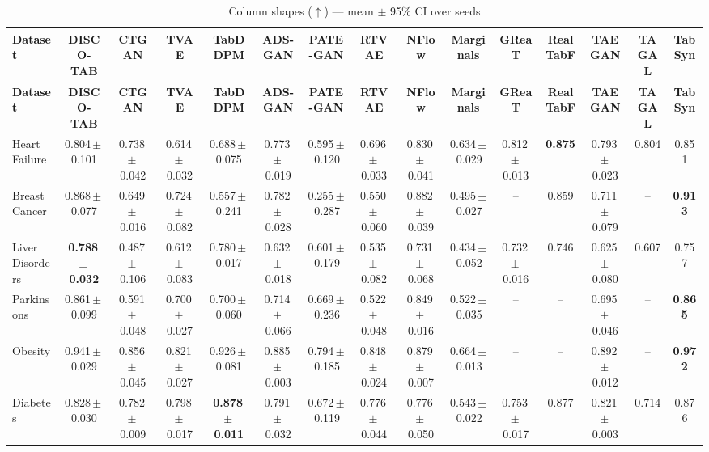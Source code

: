 \documentclass[8pt]{extarticle}
\begin{document}
\begin{longtable}{l*{14}{c}}
\caption{Column shapes ($\uparrow$) --- mean $\pm$ 95\% CI over seeds}\\
\toprule
\textbf{Dataset} & \textbf{DISCO-TAB} & \textbf{CTGAN} & \textbf{TVAE} & \textbf{TabDDPM} & \textbf{ADS-GAN} & \textbf{PATE-GAN} & \textbf{RTVAE} & \textbf{NFlow} & \textbf{Marginals} & \textbf{GReaT} & \textbf{RealTabF} & \textbf{TAEGAN} & \textbf{TAGAL} & \textbf{TabSyn} \\
\midrule
\endfirsthead
\toprule
\textbf{Dataset} & \textbf{DISCO-TAB} & \textbf{CTGAN} & \textbf{TVAE} & \textbf{TabDDPM} & \textbf{ADS-GAN} & \textbf{PATE-GAN} & \textbf{RTVAE} & \textbf{NFlow} & \textbf{Marginals} & \textbf{GReaT} & \textbf{RealTabF} & \textbf{TAEGAN} & \textbf{TAGAL} & \textbf{TabSyn} \\
\midrule
\endhead
\bottomrule
\endfoot
Heart Failure & 0.804\,$\pm$\,0.101 & 0.738\,$\pm$\,0.042 & 0.614\,$\pm$\,0.032 & 0.688\,$\pm$\,0.075 & 0.773\,$\pm$\,0.019 & 0.595\,$\pm$\,0.120 & 0.696\,$\pm$\,0.033 & 0.830\,$\pm$\,0.041 & 0.634\,$\pm$\,0.029 & 0.812\,$\pm$\,0.013 & \textbf{0.875} & 0.793\,$\pm$\,0.023 & 0.804 & 0.851 \\
Breast Cancer & 0.868\,$\pm$\,0.077 & 0.649\,$\pm$\,0.016 & 0.724\,$\pm$\,0.082 & 0.557\,$\pm$\,0.241 & 0.782\,$\pm$\,0.028 & 0.255\,$\pm$\,0.287 & 0.550\,$\pm$\,0.060 & 0.882\,$\pm$\,0.039 & 0.495\,$\pm$\,0.027 & -- & 0.859 & 0.711\,$\pm$\,0.079 & -- & \textbf{0.913} \\
Liver Disorders & \textbf{0.788\,$\pm$\,0.032} & 0.487\,$\pm$\,0.106 & 0.612\,$\pm$\,0.083 & 0.780\,$\pm$\,0.017 & 0.632\,$\pm$\,0.018 & 0.601\,$\pm$\,0.179 & 0.535\,$\pm$\,0.082 & 0.731\,$\pm$\,0.068 & 0.434\,$\pm$\,0.052 & 0.732\,$\pm$\,0.016 & 0.746 & 0.625\,$\pm$\,0.080 & 0.607 & 0.757 \\
Parkinsons & 0.861\,$\pm$\,0.099 & 0.591\,$\pm$\,0.048 & 0.700\,$\pm$\,0.027 & 0.700\,$\pm$\,0.060 & 0.714\,$\pm$\,0.066 & 0.669\,$\pm$\,0.236 & 0.522\,$\pm$\,0.048 & 0.849\,$\pm$\,0.016 & 0.522\,$\pm$\,0.035 & -- & -- & 0.695\,$\pm$\,0.046 & -- & \textbf{0.865} \\
Obesity & 0.941\,$\pm$\,0.029 & 0.856\,$\pm$\,0.045 & 0.821\,$\pm$\,0.027 & 0.926\,$\pm$\,0.081 & 0.885\,$\pm$\,0.003 & 0.794\,$\pm$\,0.185 & 0.848\,$\pm$\,0.024 & 0.879\,$\pm$\,0.007 & 0.664\,$\pm$\,0.013 & -- & -- & 0.892\,$\pm$\,0.012 & -- & \textbf{0.972} \\
Diabetes & 0.828\,$\pm$\,0.030 & 0.782\,$\pm$\,0.009 & 0.798\,$\pm$\,0.017 & \textbf{0.878\,$\pm$\,0.011} & 0.791\,$\pm$\,0.032 & 0.672\,$\pm$\,0.119 & 0.776\,$\pm$\,0.044 & 0.776\,$\pm$\,0.050 & 0.543\,$\pm$\,0.022 & 0.753\,$\pm$\,0.017 & 0.877 & 0.821\,$\pm$\,0.003 & 0.714 & 0.876 \\

\end{longtable}
\end{document}
